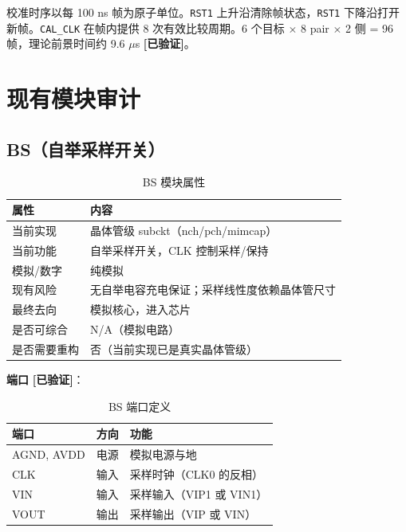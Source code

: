 \documentclass[UTF8,a4paper,11pt]{ctexart}
\newcommand{\verified}{\textcolor{verifiedgreen}{\textbf{[已验证]}}}
\providecommand{\textmu}{\ensuremath{\mu}}
\begin{document}
校准时序以每 100 ns 帧为原子单位。\texttt{RST1} 上升沿清除帧状态，\texttt{RST1} 下降沿打开新帧。\texttt{CAL\_CLK} 在帧内提供 8 次有效比较周期。6 个目标 $\times$ 8 pair $\times$ 2 侧 = 96 帧，理论前景时间约 9.6 \textmu s \verified。

\section{现有模块审计}

\subsection{BS（自举采样开关）}

\begin{table}[H]
\centering
\caption{BS 模块属性}
\label{tab:bs-attr}
\begin{tabular}{ll}
\toprule
属性 & 内容 \\
\midrule
当前实现   & 晶体管级 subckt（nch/pch/mimcap） \\
当前功能   & 自举采样开关，CLK 控制采样/保持 \\
模拟/数字  & 纯模拟 \\
现有风险   & 无自举电容充电保证；采样线性度依赖晶体管尺寸 \\
最终去向   & 模拟核心，进入芯片 \\
是否可综合 & N/A（模拟电路） \\
是否需要重构 & 否（当前实现已是真实晶体管级） \\
\bottomrule
\end{tabular}
\end{table}

\textbf{端口} \verified：

\begin{table}[H]
\centering
\caption{BS 端口定义}
\label{tab:bs-ports}
\begin{tabular}{lll}
\toprule
端口 & 方向 & 功能 \\
\midrule
AGND, AVDD & 电源 & 模拟电源与地 \\
CLK        & 输入 & 采样时钟（CLK0 的反相） \\
VIN        & 输入 & 采样输入（VIP1 或 VIN1） \\
VOUT       & 输出 & 采样输出（VIP 或 VIN） \\
\bottomrule
\end{tabular}
\end{table}
\end{document}
